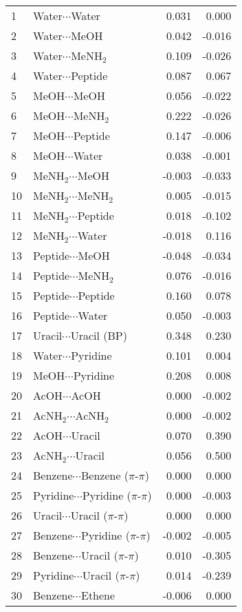 \begin{longtable}{llrr}
1 & Water$\cdots$Water & 0.031 & 0.000 \\
2 & Water$\cdots$MeOH & 0.042 & -0.016 \\
3 & Water$\cdots$MeNH$_2$ & 0.109 & -0.026 \\
4 & Water$\cdots$Peptide & 0.087 & 0.067 \\
5 & MeOH$\cdots$MeOH & 0.056 & -0.022 \\
6 & MeOH$\cdots$MeNH$_2$ & 0.222 & -0.026 \\
7 & MeOH$\cdots$Peptide & 0.147 & -0.006 \\
8 & MeOH$\cdots$Water & 0.038 & -0.001 \\
9 & MeNH$_2$$\cdots$MeOH & -0.003 & -0.033 \\
10 & MeNH$_2$$\cdots$MeNH$_2$ & 0.005 & -0.015 \\
11 & MeNH$_2$$\cdots$Peptide & 0.018 & -0.102 \\
12 & MeNH$_2$$\cdots$Water & -0.018 & 0.116 \\
13 & Peptide$\cdots$MeOH & -0.048 & -0.034 \\
14 & Peptide$\cdots$MeNH$_2$ & 0.076 & -0.016 \\
15 & Peptide$\cdots$Peptide & 0.160 & 0.078 \\
16 & Peptide$\cdots$Water & 0.050 & -0.003 \\
17 & Uracil$\cdots$Uracil (BP) & 0.348 & 0.230 \\
18 & Water$\cdots$Pyridine & 0.101 & 0.004 \\
19 & MeOH$\cdots$Pyridine & 0.208 & 0.008 \\
20 & AcOH$\cdots$AcOH & 0.000 & -0.002 \\
21 & AcNH$_2$$\cdots$AcNH$_2$ & 0.000 & -0.002 \\
22 & AcOH$\cdots$Uracil & 0.070 & 0.390 \\
23 & AcNH$_2$$\cdots$Uracil & 0.056 & 0.500 \\
24 & Benzene$\cdots$Benzene ($\pi$-$\pi$) & 0.000 & 0.000 \\
25 & Pyridine$\cdots$Pyridine ($\pi$-$\pi$) & 0.000 & -0.003 \\
26 & Uracil$\cdots$Uracil ($\pi$-$\pi$) & 0.000 & 0.000 \\
27 & Benzene$\cdots$Pyridine ($\pi$-$\pi$) & -0.002 & -0.005 \\
28 & Benzene$\cdots$Uracil ($\pi$-$\pi$) & 0.010 & -0.305 \\
29 & Pyridine$\cdots$Uracil ($\pi$-$\pi$) & 0.014 & -0.239 \\
30 & Benzene$\cdots$Ethene & -0.006 & 0.000 \\

\end{longtable}
